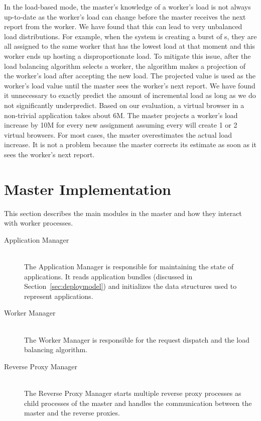 In the load-based mode, the master's knowledge of a worker's load is not
always up-to-date as the worker's load can change before the master receives the
next report from the worker. We have found that this can lead to very unbalanced load
distributions. For example, when the system is creating a burst of \appins{}s,
they are all assigned to the same worker that has the lowest load at that
moment and this worker ends up hosting a disproportionate load.  To mitigate
this issue,  after the load balancing algorithm selects a worker, the
algorithm makes a projection of the worker's load after accepting the new
load. The projected value is used as the worker's load value  until the master
sees the worker's next report.  We have found it unnecessary to exactly 
predict the amount of incremental load as long as we do not significantly 
underpredict.  Based on our evaluation, a virtual
browser in a non-trivial application takes about 6M.  The master projects a
worker's load increase by 10M for every new \appins assignment assuming every
\appins will create 1 or 2 virtual browsers.  For most cases, the master
overestimates the actual load increase. It is not a problem because the master
corrects its estimate as soon as it sees the worker's next report. 

\section{Master Implementation}
\label{sec:masterimpl}

This section describes the main modules in the master and how they interact
with worker processes.

\begin{description}
\item[Application Manager] \hfill \\
The Application Manager is responsible for maintaining the state of applications. 
It reads application bundles (discussed in Section~\ref{sec:deploymodel}) and
initializes the data structures used to represent applications.

\item[Worker Manager] \hfill \\
The Worker Manager is responsible for the request dispatch
and the load balancing algorithm.

\item[Reverse Proxy Manager] \hfill \\
The Reverse Proxy Manager starts multiple reverse proxy processes as child
processes of the master and handles the communication between the master and
the reverse proxies.
\end{description}

